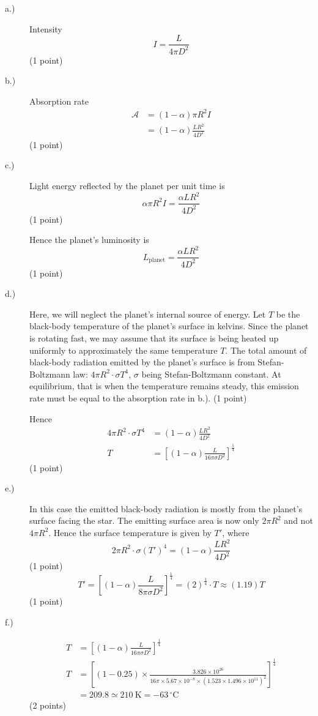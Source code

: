 \begin{description}
\item[a.)] Intensity
  \[ I = \frac{L}{4\pi D^2} \]
  \hfill(1 point)
\item[b.)] Absorption rate
  \begin{align*}
  \mathcal{A} &= \left(1-\alpha\right)\pi R^2 I\\
              &= \left(1-\alpha\right)\frac{LR^2}{4D^2}
  \end{align*}
  \hfill(1 point)
\item[c.)] Light energy reflected by the planet per unit time is
  \[ \alpha\pi R^2 I = \frac{\alpha L R^2}{4D^2} \]
  \hfill(1 point)

  Hence the planet's luminosity is
  \[ L_{\mathrm{planet}} = \frac{\alpha L R^2}{4D^2} \]
  \hfill(1 point)
\item[d.)] Here, we will neglect the planet's internal source of energy. Let
  $T$ be the black-body temperature of the planet's surface in kelvins. Since
  the planet is rotating fast, we may assume that its surface is being heated
  up uniformly to approximately the same temperature $T$. The total amount of
  black-body radiation emitted by the planet's surface is from
  Stefan-Boltzmann law: $4\pi R^2 \cdot \sigma T^4$, $\sigma$ being
  Stefan-Boltzmann constant. At equilibrium, that is when the temperature
  remains steady, this emission rate must be equal to the absorption rate in
  b.). \hfill(1 point)

  Hence
  \begin{align*}
  4\pi R^2 \cdot \sigma T^4 &= \left(1-\alpha\right)\frac{LR^2}{4D^2}\\
  T &= \left[\left(1-\alpha\right)\frac{L}{16\pi\sigma D^2}\right]^{\frac14}
  \end{align*}
  \hfill(1 point)
\item[e.)] In this case the emitted black-body radiation is mostly from the
  planet's surface facing the star. The emitting surface area is now only
  $2\pi R^2$ and not $4\pi R^2$. Hence the surface temperature is given by
  $T'$, where
  \[ 2\pi R^2 \cdot \sigma \left(T'\right)^4
     = \left(1-\alpha\right)\frac{LR^2}{4D^2} \]
  \hfill(1 point)
  \[ T' = \left[\left(1-\alpha\right)\frac{L}{8\pi\sigma D^2}\right]^{\frac14}
        = \left(2\right)^{\frac14}\cdot T \approx \left(1.19\right)T \]
  \hfill(1 point)
\item[f.)]
  \begin{align*}
  T &= \left[\left(1-\alpha\right)\frac{L}{16\pi\sigma D^2}\right]^{\frac14}\\
  T &= \left[\left(1-0.25\right)\times
       \frac{3.826\times 10^{26}}
            {16\pi\times 5.67\times 10^{-8}\times
             \left(1.523\times 1.496\times 10^{11}\right)^2}\right]^{\frac14}\\
    &= 209.8 \simeq 210\ \mathrm{K} = -63\,^\circ\mathrm{C}
  \end{align*}
  \hfill(2 points)
\end{description}

